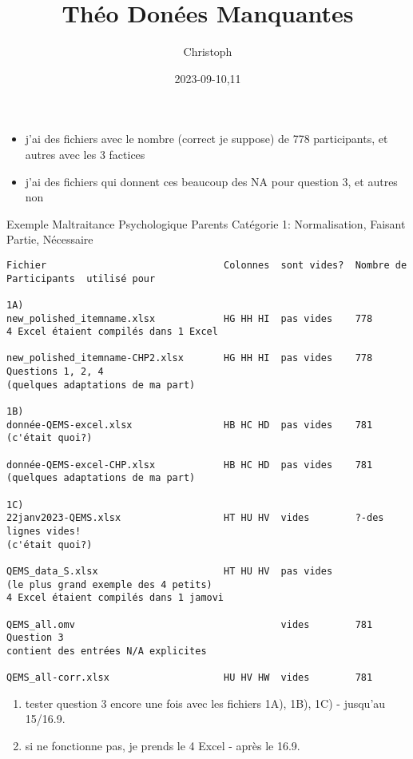 \documentclass[
]{article}
\title{Théo Donées Manquantes}
\author{Christoph}
\date{2023-09-10,11}
\providecommand{\tightlist}{%
  \setlength{\itemsep}{0pt}\setlength{\parskip}{0pt}}
\begin{document}
\maketitle

\begin{itemize}
\tightlist
\item
  j'ai des fichiers avec le nombre (correct je suppose) de 778
  participants, et autres avec les 3 factices
\item
  j'ai des fichiers qui donnent ces beaucoup des NA pour question 3, et
  autres non
\end{itemize}

Exemple Maltraitance Psychologique Parents Catégorie 1: Normalisation,
Faisant Partie, Nécessaire

\begin{verbatim}
Fichier                               Colonnes  sont vides?  Nombre de Participants  utilisé pour

1A)
new_polished_itemname.xlsx            HG HH HI  pas vides    778  
4 Excel étaient compilés dans 1 Excel
     
new_polished_itemname-CHP2.xlsx       HG HH HI  pas vides    778                     Questions 1, 2, 4
(quelques adaptations de ma part)

1B)
donnée-QEMS-excel.xlsx                HB HC HD  pas vides    781
(c'était quoi?)

donnée-QEMS-excel-CHP.xlsx            HB HC HD  pas vides    781  
(quelques adaptations de ma part)

1C)
22janv2023-QEMS.xlsx                  HT HU HV  vides        ?-des lignes vides!
(c'était quoi?)

QEMS_data_S.xlsx                      HT HU HV  pas vides
(le plus grand exemple des 4 petits)
4 Excel étaient compilés dans 1 jamovi

QEMS_all.omv                                    vides        781                     Question 3     
contient des entrées N/A explicites
        
QEMS_all-corr.xlsx                    HU HV HW  vides        781
\end{verbatim}

\begin{enumerate}
\def\labelenumi{\arabic{enumi})}
\tightlist
\item
  tester question 3 encore une fois avec les fichiers 1A), 1B), 1C) -
  jusqu'au 15/16.9.
\item
  si ne fonctionne pas, je prends le 4 Excel - après le 16.9.
\end{enumerate}
\end{document}
